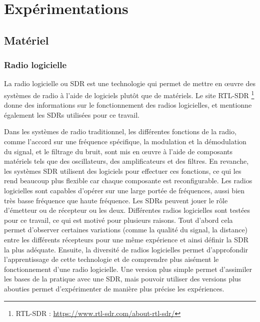 \chapter{Expérimentations}


\renewcommand{\leftmark}{EXPERIMENTATIONS}

\section{Matériel}

\subsection{Radio logicielle}

La radio logicielle ou \ac{SDR} est une technologie qui permet de mettre en œuvre des systèmes de radio à l'aide de logiciels plutôt que de matériels. Le site RTL-SDR \footnote{RTL-SDR : \href{https://www.rtl-sdr.com/about-rtl-sdr/}{https://www.rtl-sdr.com/about-rtl-sdr/}} donne des informations sur le fonctionnement des radios logicielles, et mentionne également les SDRs utilisées pour ce travail.

\vspace{0.1cm}

Dans les systèmes de radio traditionnel, les différentes fonctions de la radio, comme l'accord sur une fréquence spécifique, la modulation et la démodulation du signal, et le filtrage du bruit, sont mis en œuvre à l'aide de composants matériels tels que des oscillateurs, des amplificateurs et des filtres. En revanche, les systèmes \ac{SDR} utilisent des logiciels pour effectuer ces fonctions, ce qui les rend beaucoup plus flexible car chaque composante est reconfigurable. Les radios logicielles sont capables d'opérer sur une large portée de fréquences, aussi bien très basse fréquence que haute fréquence.
Les \ac{SDR}s peuvent jouer le rôle d'émetteur ou de récepteur ou les deux. Différentes radios logicielles sont testées pour ce travail, ce qui est motivé pour plusieurs raisons. Tout d'abord cela permet d'observer certaines variations (comme la qualité du signal, la distance) entre les différents récepteurs pour une même expérience et ainsi définir la \ac{SDR} la plus adéquate. Ensuite, la diversité de radios logicielles permet d'approfondir l'apprentissage de cette technologie et de comprendre plus aisément le fonctionnement d'une radio logicielle. Une version plus simple permet d'assimiler les bases de la pratique avec une \ac{SDR}, mais pouvoir utiliser des versions plus abouties permet d'expérimenter de manière plus précise les expériences.

